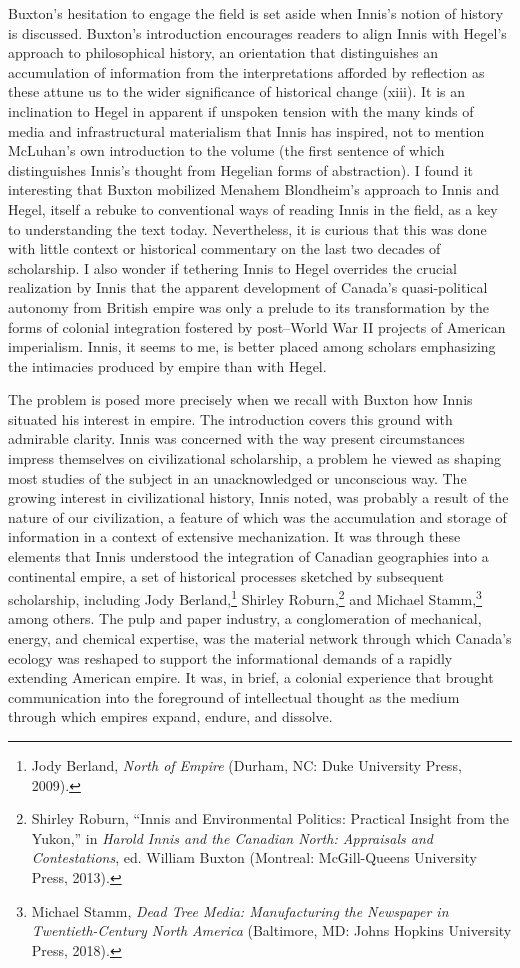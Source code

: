 \documentclass{tufte-handout}
\begin{document}
Buxton's hesitation to engage the field is set aside when Innis's notion
of history is discussed. Buxton's introduction encourages readers to
align Innis with Hegel's approach to philosophical history, an
orientation that distinguishes an accumulation of information from the
interpretations afforded by reflection as these attune us to the wider
significance of historical change (xiii). It is an inclination to Hegel
in apparent if unspoken tension with the many kinds of media and
infrastructural materialism that Innis has inspired, not to mention
McLuhan's own introduction to the volume (the first sentence of which
distinguishes Innis's thought from Hegelian forms of abstraction). I
found it interesting that Buxton mobilized Menahem Blondheim's approach
to Innis and Hegel, itself a rebuke to conventional ways of reading
Innis in the field, as a key to understanding the text today.
Nevertheless, it is curious that this was done with little context or
historical commentary on the last two decades of scholarship. I also
wonder if tethering Innis to Hegel overrides the crucial realization by
Innis that the apparent development of Canada's quasi-political autonomy
from British empire was only a prelude to its transformation by the
forms of colonial integration fostered by post--World War II projects of
American imperialism. Innis, it seems to me, is better placed among
scholars emphasizing the intimacies produced by empire than with Hegel.

The problem is posed more precisely when we recall with Buxton how Innis
situated his interest in empire. The introduction covers this ground
with admirable clarity. Innis was concerned with the way present
circumstances impress themselves on civilizational scholarship, a
problem he viewed as shaping most studies of the subject in an
unacknowledged or unconscious way. The growing interest in
civilizational history, Innis noted, was probably a result of the nature
of our civilization, a feature of which was the accumulation and storage
of information in a context of extensive mechanization. It was through
these elements that Innis understood the integration of Canadian
geographies into a continental empire, a set of historical processes
sketched by subsequent scholarship, including Jody Berland,\footnote{Jody
  Berland, \emph{North of Empire} (Durham, NC: Duke University Press,
  2009).} Shirley Roburn,\footnote{Shirley Roburn, ``Innis and
  Environmental Politics: Practical Insight from the Yukon,'' in
  \emph{Harold Innis and the Canadian North: Appraisals and
  Contestations}, ed. William Buxton (Montreal: McGill-Queens University
  Press, 2013).} and Michael Stamm,\footnote{Michael Stamm, \emph{Dead
  Tree Media: Manufacturing the Newspaper in Twentieth-Century North
  America} (Baltimore, MD: Johns Hopkins University Press, 2018).} among
others. The pulp and paper industry, a conglomeration of mechanical,
energy, and chemical expertise, was the material network through which
Canada's ecology was reshaped to support the informational demands of a
rapidly extending American empire. It was, in brief, a colonial
experience that brought communication into the foreground of
intellectual thought as the medium through which empires expand, endure,
and dissolve.
\end{document}
